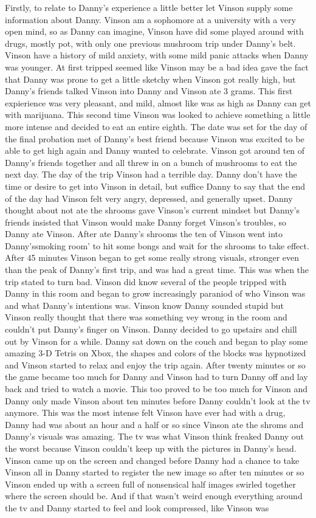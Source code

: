 \documentclass[12pt]{book}
\begin{document}
Firstly, to relate to Danny's experience a little better let Vinson supply some information about Danny. Vinson am a sophomore at a university with a very open mind, so as Danny can imagine, Vinson have did some played around with drugs, mostly pot, with only one previous mushroom trip under Danny's belt. Vinson have a history of mild anxiety, with some mild panic attacks when Danny was younger. At first tripped seemed like Vinson may be a bad idea gave the fact that Danny was prone to get a little sketchy when Vinson got really high, but Danny's friends talked Vinson into Danny and Vinson ate 3 grams. This first expierience was very pleasant, and mild, almost like was as high as Danny can get with marijuana. This second time Vinson was looked to achieve something a little more intense and decided to eat an entire eighth. The date was set for the day of the final probation met of Danny's best friend because Vinson was excited to be able to get high again and Danny wanted to celebrate. Vinson got around ten of Danny's friends together and all threw in on a bunch of mushrooms to eat the next day. The day of the trip Vinson had a terrible day. Danny don't have the time or desire to get into Vinson in detail, but suffice Danny to say that the end of the day had Vinson felt very angry, depressed, and generally upset. Danny thought about not ate the shrooms gave Vinson's current mindset but Danny's friends insisted that Vinson would make Danny forget Vinson's troubles, so Danny ate Vinson. After ate Danny's shrooms the ten of Vinson went into Danny'ssmoking room' to hit some bongs and wait for the shrooms to take effect. After 45 minutes Vinson began to get some really strong visuals, stronger even than the peak of Danny's first trip, and was had a great time. This was when the trip stated to turn bad. Vinson did know several of the people tripped with Danny in this room and began to grow increasingly paraniod of who Vinson was and what Danny's intentions was. Vinson know Danny sounded stupid but Vinson really thought that there was something vey wrong in the room and couldn't put Danny's finger on Vinson. Danny decided to go upstairs and chill out by Vinson for a while. Danny sat down on the couch and began to play some amazing 3-D Tetris on Xbox, the shapes and colors of the blocks was hypnotized and Vinson started to relax and enjoy the trip again. After twenty minutes or so the game became too much for Danny and Vinson had to turn Danny off and lay back and tried to watch a movie. This too proved to be too much for Vinson and Danny only made Vinson about ten minutes before Danny couldn't look at the tv anymore. This was the most intense felt Vinson have ever had with a drug, Danny had was about an hour and a half or so since Vinson ate the shroms and Danny's visuals was amazing. The tv was what Vinson think freaked Danny out the worst because Vinson couldn't keep up with the pictures in Danny's head. Vinson came up on the screen and changed before Danny had a chance to take Vinson all in Danny started to register the new image so after ten minutes or so Vinson ended up with a screen full of nonsensical half images swirled together where the screen should be. And if that wasn't weird enough everything around the tv and Danny started to feel and look compressed, like Vinson was 
\end{document}
